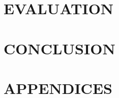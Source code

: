 
 
\part{EVALUATION}








\part{CONCLUSION}

		
\fi


%



%
%






\backmatter
\raggedright

\printbibliography

\justify


\part{APPENDICES}

